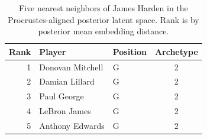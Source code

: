 \begin{table}[htbp]
  \centering\small
  \begin{tabular}{rllc}
    \toprule
    Rank & Player & Position & Archetype \\
    \midrule
    1 & Donovan Mitchell & G & 2 \\
    2 & Damian Lillard & G & 2 \\
    3 & Paul George & G & 2 \\
    4 & LeBron James & G & 2 \\
    5 & Anthony Edwards & G & 2 \\
    \bottomrule
  \end{tabular}
  \caption{Five nearest neighbors of James Harden in the Procrustes-aligned posterior latent space. Rank is by posterior mean embedding distance.}
  \label{tab:James_Harden_neighbors}
\end{table}

